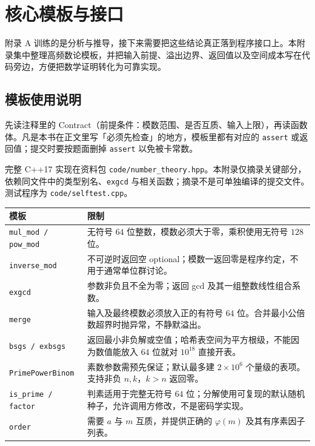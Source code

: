 \documentclass[UTF8,a4paper,11pt,twoside,openright,fontset=fandol]{ctexbook}
\theoremstyle{definition}
\begin{document}
\clearpage
\setcounter{page}{1}
\chapter{核心模板与接口}
\begin{chapterintro}[章节导读]
附录 A 训练的是分析与推导，接下来需要把这些结论真正落到程序接口上。本附录集中整理高频数论模板，并把输入前提、溢出边界、返回值以及空间成本写在代码旁边，方便把数学证明转化为可靠实现。
\end{chapterintro}

\section{模板使用说明}

\begin{tip}[附录代码怎么读]
先读注释里的 Contract（前提条件：模数范围、是否互质、输入上限），再读函数体。凡是本书在正文里写「必须先检查」的地方，模板里都有对应的 \texttt{assert} 或返回值；提交时要按题面删掉 \texttt{assert} 以免被卡常数。
\end{tip}

完整 C++17 实现在资料包 \texttt{code/number\_theory.hpp}。本附录仅摘录关键部分，依赖同文件中的类型别名、\texttt{exgcd} 与相关函数；摘录不是可单独编译的提交文件。测试程序为 \texttt{code/selftest.cpp}。

\begin{longtable}{p{}p{}}
\toprule
模板 & 限制\\\midrule
\texttt{mul\_mod / pow\_mod} & 无符号 $64$ 位整数，模数必须大于零，乘积使用无符号 $128$ 位。\\
\texttt{inverse\_mod} & 不可逆时返回空 optional；模数一返回零是程序约定，不用于通常单位群讨论。\\
\texttt{exgcd} & 参数非负且不全为零；返回 gcd 及其一组整数线性组合系数。\\
\texttt{merge} & 输入及最终模数必须放入正的有符号 $64$ 位。合并最小公倍数超界时抛异常，不静默溢出。\\
\texttt{bsgs / exbsgs} & 返回最小非负解或空值；哈希表空间为平方根级，不能因为数值能放入 $64$ 位就对 $10^{18}$ 直接开表。\\
\texttt{PrimePowerBinom} & 素数参数需预先保证；默认最多建 $2\times10^6$ 个量级的表项。支持非负 $n,k$，$k>n$ 返回零。\\
\texttt{is\_prime / factor} & 判素适用于完整无符号 $64$ 位；分解使用可复现的默认随机种子，允许调用方修改，不是密码学实现。\\
\texttt{order} & 需要 $a$ 与 $m$ 互质，并提供正确的 $\varphi(m)$ 及其有序素因子列表。\\
\bottomrule
\end{longtable}
\end{document}

